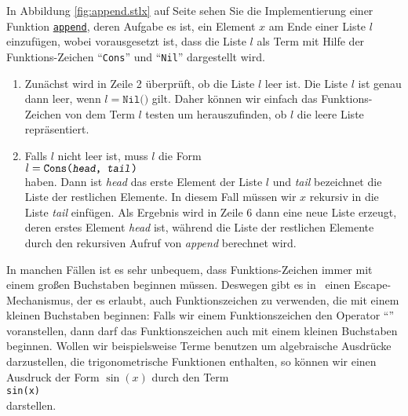 In Abbildung  \ref{fig:append.stlx} auf Seite \pageref{fig:append.stlx} sehen Sie die
Implementierung  einer Funktion
\href{https://github.com/karlstroetmann/Logik/blob/master/SetlX/append.stlx}{\texttt{append}},
deren Aufgabe es ist, ein Element $x$ am Ende einer Liste $l$ einzufügen, wobei vorausgesetzt ist,
dass die Liste $l$ als Term mit Hilfe der Funktions-Zeichen ``\texttt{Cons}'' und ``\texttt{Nil}''
dargestellt wird.
\begin{enumerate}
\item Zunächst wird in Zeile 2 überprüft, ob die Liste $l$ leer ist.  Die Liste $l$ ist genau dann
      leer, wenn $l = \texttt{Nil()}$ gilt.  Daher können wir einfach das Funktions-Zeichen von dem
      Term $l$ testen um herauszufinden, ob $l$ die leere Liste repräsentiert.
\item Falls $l$ nicht leer ist, muss $l$ die Form
      \\[0.2cm]
      \hspace*{1.3cm}
      $l = \texttt{Cons(\textsl{head}, \textsl{tail})}$
      \\[0.2cm]     
      haben.  Dann ist \textsl{head} das erste Element der Liste $l$ und \textsl{tail} bezeichnet
      die Liste der restlichen Elemente.  In diesem Fall müssen wir $x$ rekursiv in die Liste
      \textsl{tail} einfügen.  Als Ergebnis wird in Zeile 6 dann eine neue Liste erzeugt, deren
      erstes Element \textsl{head} ist, während die Liste der restlichen Elemente durch den
      rekursiven Aufruf von \textsl{append} berechnet wird.
\end{enumerate}
In manchen Fällen ist es sehr unbequem, dass Funktions-Zeichen immer mit einem großen Buchstaben
beginnen müssen.  Deswegen gibt es in \setl\ einen Escape-Mechanismus, der es erlaubt, auch
Funktionszeichen zu verwenden, die mit einem kleinen Buchstaben beginnen:  Falls wir einem
Funktionszeichen den Operator ``\texttt{}'' voranstellen, dann darf das Funktionszeichen
auch mit einem kleinen Buchstaben beginnen.  Wollen wir beispielsweise Terme benutzen um
algebraische Ausdrücke darzustellen, die trigonometrische Funktionen enthalten, 
so können wir einen Ausdruck der Form $\sin(x)$ durch den Term
\\[0.2cm]
\hspace*{1.3cm}
\texttt{sin(x)}  
\\[0.2cm]
darstellen.

